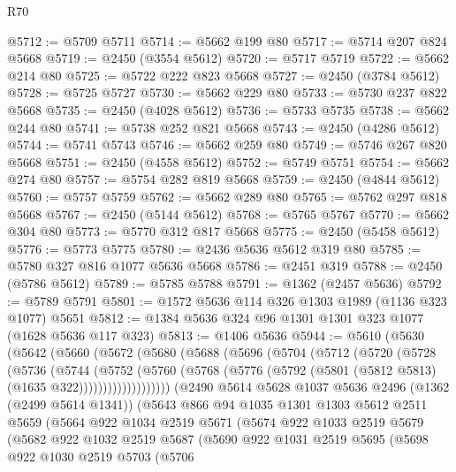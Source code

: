 \begin{lexlean}{R70}
\begin{coremodule}
@5712 := @5709 @5711
@5714 := @5662 @199 @80
@5717 := @5714 @207 @824 @5668
@5719 := @2450 (@3554 @5612)
@5720 := @5717 @5719
@5722 := @5662 @214 @80
@5725 := @5722 @222 @823 @5668
@5727 := @2450 (@3784 @5612)
@5728 := @5725 @5727
@5730 := @5662 @229 @80
@5733 := @5730 @237 @822 @5668
@5735 := @2450 (@4028 @5612)
@5736 := @5733 @5735
@5738 := @5662 @244 @80
@5741 := @5738 @252 @821 @5668
@5743 := @2450 (@4286 @5612)
@5744 := @5741 @5743
@5746 := @5662 @259 @80
@5749 := @5746 @267 @820 @5668
@5751 := @2450 (@4558 @5612)
@5752 := @5749 @5751
@5754 := @5662 @274 @80
@5757 := @5754 @282 @819 @5668
@5759 := @2450 (@4844 @5612)
@5760 := @5757 @5759
@5762 := @5662 @289 @80
@5765 := @5762 @297 @818 @5668
@5767 := @2450 (@5144 @5612)
@5768 := @5765 @5767
@5770 := @5662 @304 @80
@5773 := @5770 @312 @817 @5668
@5775 := @2450 (@5458 @5612)
@5776 := @5773 @5775
@5780 := @2436 @5636 @5612 @319 @80
@5785 := @5780 @327 @816 @1077 @5636 @5668
@5786 := @2451 @319
@5788 := @2450 (@5786 @5612)
@5789 := @5785 @5788
@5791 := @1362 (@2457 @5636)
@5792 := @5789 @5791
@5801 := @1572 @5636 @114 @326 @1303 @1989 (@1136 @323 @1077) @5651
@5812 := @1384 @5636 @324 @96 @1301 @1301 @323 @1077 (@1628 @5636 @117 @323)
@5813 := @1406 @5636
@5944 := @5610
    (@5630
      (@5642
        (@5660
          (@5672
            (@5680
              (@5688
                (@5696
                  (@5704
                    (@5712
                      (@5720
                        (@5728
                          (@5736
                            (@5744
                              (@5752
                                (@5760
                                  (@5768
                                    (@5776
                                      (@5792 (@5801 (@5812 @5813) (@1635 @322)))))))))))))))))))
      (@2490
        @5614
        @5628
        @1037
        @5636
        @2496
        (@1362 (@2499 @5614 @1341))
        (@5643
          @866
          @94
          @1035
          @1301
          @1303
          @5612
          @2511
          @5659
          (@5664
            @922
            @1034
            @2519
            @5671
            (@5674
              @922
              @1033
              @2519
              @5679
              (@5682
                @922
                @1032
                @2519
                @5687
                (@5690
                  @922
                  @1031
                  @2519
                  @5695
                  (@5698
                    @922
                    @1030
                    @2519
                    @5703
                    (@5706

\end{coremodule}
\end{lexlean}
